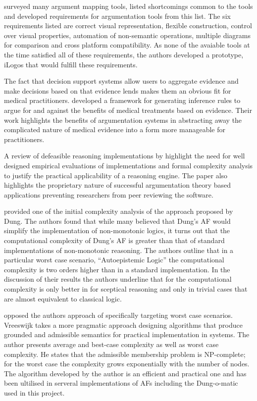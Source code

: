 \cite{easterday2009design} surveyed many argument mapping tools, listed shortcomings common to the tools and developed requirements for argumentation tools from this list.
The six requirements listed are correct visual representation, flexible construction, control over visual properties, automation of non-semantic operations, multiple diagrams for comparison and cross platform compatibility.
As none of the avaiable tools at the time satisfied all of these requirements, the authors developed a prototype, iLogos that would fulfill these requirements.

The fact that decision support systems allow users to aggregate evidence and make decisions based on that evidence lends makes them an obvious fit for medical practitioners. \cite{hunter2010argumentation} developed a framework for generating inference rules to argue for and against the benefits of medical treatments based on evidence. Their work highlights the benefits of argumentation systems in abstracting away the complicated nature of medical evidence into a form more manageable for practitioners.

A review of defeasible reasoning implementations by \cite{bryant2008review} highlight the need for well designed empirical evaluations of implementations and formal complexity analysis to justify the practical applicability of a reasoning engine. The paper also highlights the proprietary nature of successful argumentation theory based applications preventing researchers from peer reviewing the software.

\cite{dimopoulosfinding} provided one of the initial complexity analysis of the approach proposed by Dung. The authors found that while many believed that Dung's AF would simplify the implementation of non-monotonic logics, it turns out that the computational complexity of Dung's AF is greater than that of standard implementations of non-monotonic reasoning. The authors outline that in a particular worst case scenario, ``Autoepistemic Logic'' the computational complexity is two orders higher than in a standard implementation. In the discussion of their results the authors underline that for the computational complexity is only better in for sceptical reasoning and only in trivial cases that are almost equivalent to classical logic.

\cite{vreeswijk2006algorithm} opposed the authors approach of specifically targeting worst case scenarios. Vreeswijk takes a more pragmatic approach designing algorithms that produce grounded and admissible semantics for practical implementation in systems. The author presents average and best-case complexity as well as worst case complexity. He states that the admissible membership problem is NP-complete; for the worst case the complexity grows exponentially with the number of nodes. The algorithm developed by the author is an efficient and practical one and has been ultilised in serveral implementations of AFs including the Dung-o-matic used in this project.


